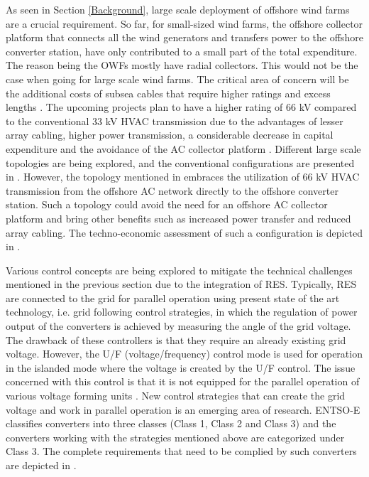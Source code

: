 As seen in Section \ref{Background}, large scale deployment of offshore wind farms are a crucial requirement. So far, for small-sized wind farms, the offshore collector platform that connects all the wind generators and transfers power to the offshore converter station, have only contributed to a small part of the total expenditure. The reason being the \gls{OWF}s mostly have radial collectors. This would not be the case when going for large scale wind farms. The critical area of concern will be the additional costs of subsea cables that require higher ratings and excess lengths \cite{quinonez-varela_electrical_2007}. The upcoming projects plan to have a higher rating of 66 kV compared to the conventional 33 kV \gls{HVAC} transmission due to the advantages of lesser array cabling, higher power transmission, a considerable decrease in capital expenditure and the avoidance of the \gls{AC} collector platform \cite{dnv66kv}. Different large scale topologies are being explored, and the conventional configurations are presented in \cite{guan_novel_2014}. However, the topology mentioned in \cite{lozada_ayala_dynamic_2018} embraces the utilization of 66 kV \gls{HVAC} transmission from the offshore \gls{AC} network directly to the offshore converter station. Such a topology could avoid the need for an offshore \gls{AC} collector platform and bring other benefits such as increased power transfer and reduced array cabling. The techno-economic assessment of such a configuration is depicted in \cite{misyris2020north}. 

Various control concepts are being explored to mitigate the technical challenges mentioned in the previous section due to the integration of \gls{RES}. Typically, \gls{RES} are connected to the grid for parallel operation using present state of the art technology, i.e. grid following control strategies, in which the regulation of power output of the converters is achieved by measuring the angle of the grid voltage. The drawback of these controllers is that they require an already existing grid voltage. However, the U/F (voltage/frequency) control mode is used for operation in the islanded mode where the voltage is created by the U/F control. The issue concerned with this control is that it is not equipped for the parallel operation of various voltage forming units \cite{weise2019comparison}. New control strategies that can create the grid voltage and work in parallel operation is an emerging area of research. ENTSO-E classifies converters into three classes (Class 1, Class 2 and Class 3) and the converters working with the strategies mentioned above are categorized under Class 3. The complete requirements that need to be complied by such converters are depicted in \cite{christensen2020high}.

